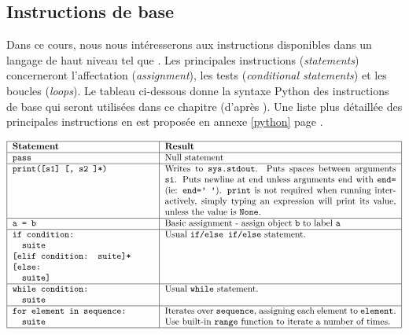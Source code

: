 \subsection{Instructions de base}
Dans ce cours, nous nous intéresserons aux instructions disponibles
dans un langage de haut niveau tel que {\python}.
Les principales instructions ({\em statements}) concerneront 
l'affectation ({\em assignment}), 
les tests ({\em conditional statements})
et les boucles ({\em loops}).
Le tableau ci-dessous donne la syntaxe {\sc Python} des instructions de base
qui seront utilisées dans ce chapitre (d'après \cite{gruet}). Une liste plus détaillée des principales 
instructions en {\python} est proposée en annexe \ref{python} page \pageref{python}.

\label{cite:gruet1}
$$\begin{tabular}{|p{5.5cm}|p{9cm}|}
\hline
\bf Statement & \bf Result \\
\hline
\tt pass & Null statement \\
\hline
\tt print([s1] [, s2 ]*) & Writes to {\tt sys.stdout}. 
                              Puts spaces between arguments {\tt si}. Puts newline at end unless arguments end with {\tt end=} (ie: {\tt end=' '}).
		              {\tt print} is not required when running interactively, simply typing an expression will print its value, 
		              unless the value is {\tt None}.\\
\hline
\tt a = b 	  & Basic assignment - assign object {\tt b} to label {\tt a}\\
\hline
\tt if condition:\newline
\mbox{}\ \ suite\newline
[elif condition: suite]*\newline
[else:\newline
\mbox{}\ \ suite] & Usual {\tt if/else if/else} statement.\\
\hline
\tt while condition:\newline
\mbox{}\ \ suite  & Usual {\tt while} statement. \\
\hline
\tt for element in sequence:\newline
\mbox{}\ \ suite  & Iterates over {\tt sequence}, assigning each element to {\tt element}. 
           Use built-in {\tt range} function to iterate a number of times.\\
\hline
\end{tabular}$$


